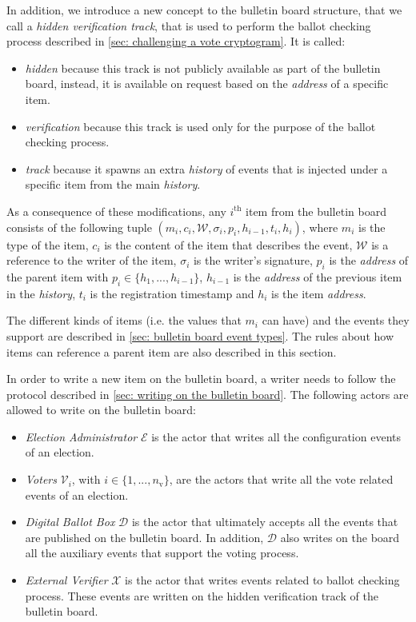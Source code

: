 In addition, we introduce a new concept to the bulletin board structure, that we call a \emph{hidden verification track}, that is used to perform the ballot checking process described in \cref{sec: challenging a vote cryptogram}. It is called:
\begin{itemize}
    \item \emph{hidden} because this track is not publicly available as part of the bulletin board, instead, it is available on request based on the \textit{address} of a specific item.
    \item \textit{verification} because this track is used only for the purpose of the ballot checking process.
    \item \emph{track} because it spawns an extra \textit{history} of events that is injected under a specific item from the main \textit{history}.
\end{itemize}

As a consequence of these modifications, any $i^\mathrm{th}$ item from the bulletin board consists of the following tuple $(m_i, c_i, \mathcal{W}, \sigma_i, p_i, h_{i-1}, t_i, h_i)$, where $m_i$ is the type of the item, $c_i$ is the content of the item that describes the event, $\mathcal{W}$ is a reference to the writer of the item, $\sigma_i$ is the writer's signature, $p_i$ is the \textit{address} of the parent item with $p_i \in \{h_1, ..., h_{i-1}\}$, $h_{i-1}$ is the \textit{address} of the previous item in the \textit{history}, $t_i$ is the registration timestamp and $h_i$ is the item \textit{address}.

The different kinds of items (i.e. the values that $m_i$ can have) and the events they support are described in \cref{sec: bulletin board event types}. The rules about how items can reference a parent item are also described in this section.

In order to write a new item on the bulletin board, a writer needs to follow the protocol described in \cref{sec: writing on the bulletin board}. The following actors are allowed to write on the bulletin board:
\begin{itemize}
    \item \textit{Election Administrator} $\mathcal{E}$ is the actor that writes all the configuration events of an election.
    \item \textit{Voters} $\mathcal{V}_i$, with $i \in \{1, ..., n_\mathrm{v}\}$, are the actors that write all the vote related events of an election.
    \item \textit{Digital Ballot Box} $\mathcal{D}$ is the actor that ultimately accepts all the events that are published on the bulletin board. In addition, $\mathcal{D}$ also writes on the board all the auxiliary events that support the voting process.
    \item \textit{External Verifier} $\mathcal{X}$ is the actor that writes events related to ballot checking process. These events are written on the hidden verification track of the bulletin board.
\end{itemize}


